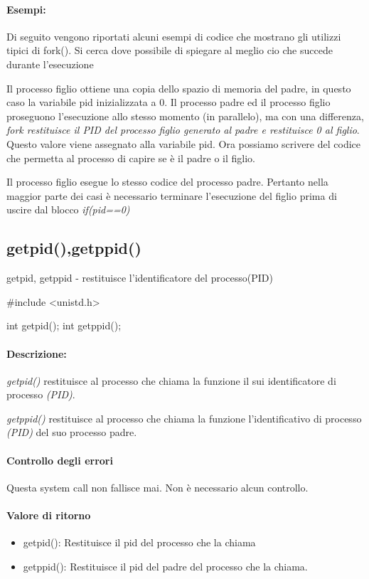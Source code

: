 \documentclass
[10pt,        %
 a4paper,     %
 onecolumn,   %
 fleqn,       %
 oneside,     %
 notitlepage, %
]{article}    %
\begin{document}
\paragraph{Esempi:}
Di seguito vengono riportati alcuni esempi di codice che mostrano gli utilizzi tipici di fork(). Si cerca dove possibile di spiegare al meglio cio che succede durante l'esecuzione

Il processo figlio ottiene una copia dello spazio di memoria del padre, in questo caso la variabile pid inizializzata a 0.
Il processo padre ed il processo figlio proseguono l'esecuzione allo stesso momento (in parallelo), ma con una differenza, \textit{fork restituisce il PID del processo figlio generato al padre e restituisce 0 al figlio}.
Questo valore viene assegnato alla variabile pid.
Ora possiamo scrivere del codice che permetta al processo di capire se è il padre o il figlio.

Il processo figlio esegue lo stesso codice del processo padre. Pertanto nella maggior parte dei casi è necessario terminare l'esecuzione del figlio prima di uscire dal blocco \textit{if(pid==0)}


\subsection{getpid(),getppid()}
getpid, getppid - restituisce l'identificatore del processo(PID)
\begin{C}
#include <unistd.h>

int getpid();
int getppid();
\end{C}
\paragraph{Descrizione:}
\textit{getpid()} restituisce al processo che chiama la funzione il sui identificatore di processo \textit{(PID)}.

\textit{getppid()} restituisce al processo che chiama la funzione l'identificativo di processo \textit{(PID)} del suo processo padre.
\paragraph{Controllo degli errori}
Questa system call non fallisce mai. Non è necessario alcun controllo.
\paragraph{Valore di ritorno}
\begin{itemize}
    \item getpid(): Restituisce il pid del processo che la chiama
    \item getppid(): Restituisce il pid del padre del processo che la chiama.
\end{itemize}
\end{document}
